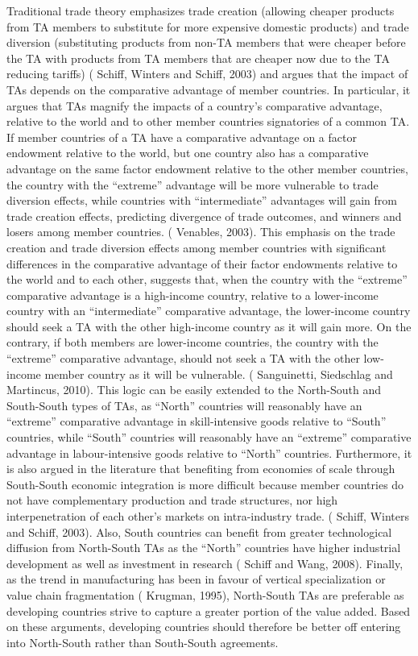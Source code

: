 Traditional trade theory emphasizes trade creation (allowing cheaper
products from TA members to substitute for more expensive domestic
products) and trade diversion (substituting products from non-TA members
that were cheaper before the TA with products from TA members that are
cheaper now due to the TA reducing tariffs) (\cite{schiff_regional_2003} Schiff, Winters and Schiff,
2003) and argues that the impact of TAs depends on the comparative
advantage of member countries. In particular, it argues that TAs magnify
the impacts of a country's comparative advantage, relative to the world
and to other member countries signatories of a common TA. If member
countries of a TA have a comparative advantage on a factor endowment
relative to the world, but one country also has a comparative advantage
on the same factor endowment relative to the other member countries, the
country with the ``extreme'' advantage will be more vulnerable to trade
diversion effects, while countries with ``intermediate'' advantages will
gain from trade creation effects, predicting divergence of trade
outcomes, and winners and losers among member countries. (\cite{venables_winners_2003} Venables,
2003). This emphasis on the trade creation and trade diversion effects
among member countries with significant differences in the comparative
advantage of their factor endowments relative to the world and to each
other, suggests that, when the country with the ``extreme'' comparative
advantage is a high-income country, relative to a lower-income country
with an ``intermediate'' comparative advantage, the lower-income country
should seek a TA with the other high-income country as it will gain
more. On the contrary, if both members are lower-income countries, the
country with the ``extreme'' comparative advantage, should not seek a TA
with the other low-income member country as it will be vulnerable.
(\cite{sanguinetti_impact_2010} Sanguinetti, Siedschlag and Martincus, 2010). This logic can be easily
extended to the North-South and South-South types of TAs, as ``North''
countries will reasonably have an ``extreme'' comparative advantage in
skill-intensive goods relative to ``South'' countries, while ``South''
countries will reasonably have an ``extreme'' comparative advantage in
labour-intensive goods relative to ``North'' countries. Furthermore, it
is also argued in the literature that benefiting from economies of scale
through South-South economic integration is more difficult because
member countries do not have complementary production and trade
structures, nor high interpenetration of each other's markets on
intra-industry trade. (\cite{schiff_regional_2003} Schiff, Winters and Schiff, 2003). Also, South
countries can benefit from greater technological diffusion from
North-South TAs as the ``North'' countries have higher industrial
development as well as investment in research (\cite{schiff_north-south_2008} Schiff and Wang, 2008).
Finally, as the trend in manufacturing has been in favour of vertical
specialization or value chain fragmentation (\cite{krugman_growing_1995} Krugman, 1995), North-South
TAs are preferable as developing countries strive to capture a greater
portion of the value added. Based on these arguments, developing
countries should therefore be better off entering into North-South
rather than South-South agreements.